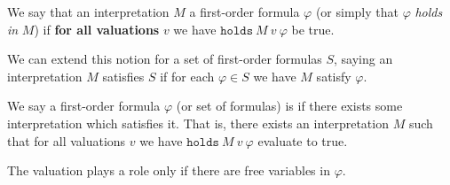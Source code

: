 \begin{node}[Semantics]
\begin{definition}\label{fol-000E}%
We say that an interpretation $M$  a first-order
formula $\varphi$ (or simply that $\varphi$ \textit{holds in} $M$) if
\textbf{for all valuations} $v$ we have $\mathtt{holds}~M~v~\varphi$
be true.

We can extend this notion for a set of first-order formulas $S$, saying
an interpretation $M$ satisfies $S$ if for each $\varphi\in S$ we have
$M$ satisfy $\varphi$.
\end{definition}

\begin{definition}\label{fol-000F}%
We say a first-order formula $\varphi$ (or set of formulas) is
 if there exists some interpretation which satisfies it.
That is, there exists an interpretation $M$ such that for all valuations
$v$ we have $\mathtt{holds}~M~v~\varphi$ evaluate to true.

The valuation plays a role only if there are free variables in $\varphi$.
\end{definition}
\end{node}
